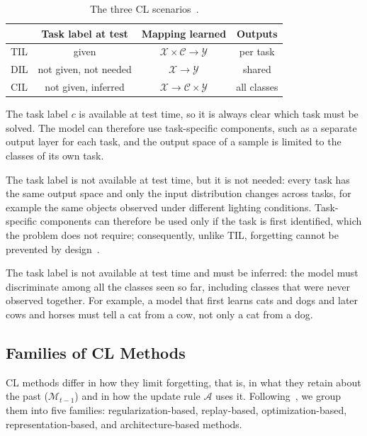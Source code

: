 \begin{table}[t]
\centering
\small
\begin{tabular}{lccc}
\toprule
 & \textbf{Task label at test} & \textbf{Mapping learned} & \textbf{Outputs} \\
\midrule
TIL & given & $\mathcal{X}\times\mathcal{C}\rightarrow\mathcal{Y}$ & per task \\
DIL & not given, not needed & $\mathcal{X}\rightarrow\mathcal{Y}$ & shared \\
CIL & not given, inferred & $\mathcal{X}\rightarrow\mathcal{C}\times\mathcal{Y}$ & all classes \\
\bottomrule
\end{tabular}
\caption{The three CL scenarios~\cite{van2022three}.}
\label{tab:scenarios}
\end{table}

The task label $c$ is available at test time, so it is always clear which task must be solved.
The model can therefore use task-specific components, such as a separate output layer for each task, and the output space of a sample is limited to the classes of its own task.

The task label is not available at test time, but it is not needed: every task has the same output space and only the input distribution changes across tasks, for example the same objects observed under different lighting conditions.
Task-specific components can therefore be used only if the task is first identified, which the problem does not require; consequently, unlike TIL, forgetting cannot be prevented by design~\cite{van2022three}.

The task label is not available at test time and must be inferred: the model must discriminate among all the classes seen so far, including classes that were never observed together.
For example, a model that first learns cats and dogs and later cows and horses must tell a cat from a cow, not only a cat from a dog.


\subsection{Families of CL Methods}
\label{sec:cl_methods}
CL methods differ in how they limit forgetting, that is, in what they retain about the past ($\mathcal{M}_{t-1}$) and in how the update rule $\mathcal{A}$ uses it.
Following~\cite{Wang2024tpami_cl}, we group them into five families: regularization-based, replay-based, optimization-based, representation-based, and architecture-based methods.

